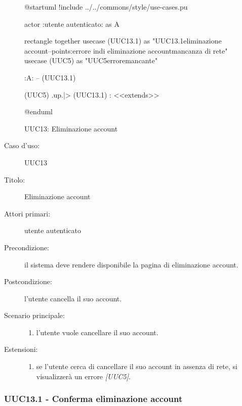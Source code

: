\documentclass[../../../analisi-dei-requisiti.tex]{subfiles}
\begin{document}
\begin{figure}[h!]
  \centering
  \begin{plantuml}
  @startuml
  !include ../../commons/style/use-cases.pu

  actor :utente autenticato: as A

  rectangle {
    together {
      usecase (UUC13.1) as "UUC13.1\nConferma eliminazione account\n--\nExtension points:\nVisualizzazione errore in\ncaso di eliminazione account\nin mancanza di rete"
      usecase (UUC5) as "UUC5\nVisualizzazione errore\nrete mancante"
    }
  }

  :A: -- (UUC13.1)

  (UUC5) .up.|> (UUC13.1) : <<extends>>

  @enduml
  \end{plantuml}
  \caption{UUC13: Eliminazione account}
  \label{fig:uuc13}
\end{figure}

\begin{description}
  \item[Caso d’uso:] UUC13
  \item[Titolo:] Eliminazione account
  \item[Attori primari:] utente autenticato
  \item[Precondizione:] il sistema deve rendere disponibile la pagina di eliminazione account.
  \item[Postcondizione:] l'utente cancella il suo account.
  \item[Scenario principale:]
        \begin{enumerate}
          \item l'utente vuole cancellare il suo account.
        \end{enumerate}
        \item[Estensioni:]
        \begin{enumerate}
          \item se l'utente cerca di cancellare il suo account in assenza di rete, si visualizzerà un errore \emph{[UUC5]}.
        \end{enumerate}
\end{description}

\subsubsection{UUC13.1 - Conferma eliminazione account}%
\label{subs:UUC13.1}
\end{document}
